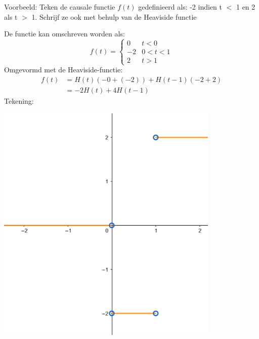 \documentclass[12pt]{report}
\newcommand{\example}[2]{
    \hrulefill
    
    Voorbeeld: #1
    
    #2
    
    \hrulefill
}
\begin{document}
\example{Teken de causale functie $f(t)$ gedefinieerd als: -2 indien t $<$ 1 en 2 als t $>$ 1. Schrijf ze ook met behulp van de Heaviside functie}{
De functie kan omschreven worden als:
$$f(t) = \begin{cases}
        0 & t < 0 \\
        -2 & 0 < t < 1 \\
        2 & t > 1
        \end{cases}
$$
Omgevormd met de Heaviside-functie:
\begin{equation*}
\begin{split}
f(t) & = H(t)(-0 + (-2)) + H(t -  1)(-2 +2) \\
    & = -2H(t) + 4H(t - 1)
\end{split}
\end{equation*}
Tekening:

\begin{center}
\includegraphics[width=0.8\textwidth]{oef5_heaviside}
\end{center}
}
\end{document}
